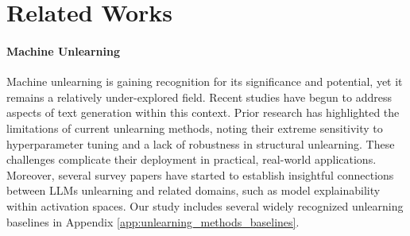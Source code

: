 \vspace{-3mm}
\section{Related Works}\label{sec:related}

\paragraph{Machine Unlearning}

Machine unlearning is gaining recognition for its significance and potential, yet it remains a relatively under-explored field. Recent studies \cite{chen2023unlearn, jang2022knowledge, ilharco2022editing, zhang2023composing} have begun to address aspects of text generation within this context.
Prior research \cite{qiu2024pistol, tofu} has highlighted the limitations of current unlearning methods, noting their extreme sensitivity to hyperparameter tuning and a lack of robustness in structural unlearning. These challenges complicate their deployment in practical, real-world applications.
Moreover, several survey papers \cite{liu2024rethinking, nguyen2022survey} have started to establish insightful connections between LLMs unlearning and related domains, such as model explainability within activation spaces. Our study includes several widely recognized unlearning baselines in Appendix \ref{app:unlearning_methods_baselines}.

